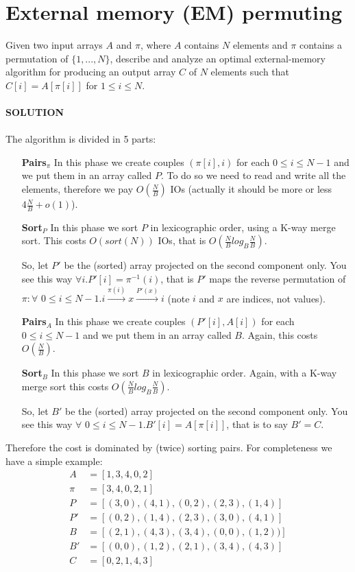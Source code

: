 \documentclass[a4paper]{article}
\begin{document}
\section*{External memory (EM) permuting}
Given two input arrays $A$ and $\pi$, where $A$ contains
$N$ elements and $\pi$ contains a permutation of $\{1, . . . , N\}$, describe and analyze an
optimal external-memory algorithm for producing an output array $C$ of $N$ elements
such that $C[i] = A[\pi[i]]$ for $1 \leq i \leq N$.
\\
\\
\textbf{SOLUTION}
\\
\\
The algorithm is divided in 5 parts:
\begin{itemize}
\item[\textbf{Pairs$_\pi$}] In this phase we create couples $(\pi[i],i)$ for each $0 \leq i \leq N-1$ and we put them in an array called $P$. To do so we need to read and write all the elements, therefore we pay $O(\frac{N}{B})$ IOs (actually it should be more or less $4\frac{N}{B}+ o(1)$).
\item[\textbf{Sort$_P$}] In this phase we sort $P$ in lexicographic order, using a K-way merge sort. This costs $O(sort(N))$ IOs, that is $O(\frac{N}{B} log_B \frac{N}{B})$.

So, let $P'$ be the (sorted) array projected on the second component only. You see this way $\forall i.P'[i] = \pi^{-1}(i)$, that is $P'$ maps the reverse permutation of $\pi: \forall$ $0 \leq i \leq N-1.i \stackrel{\pi(i)}{\longrightarrow} x \stackrel{P'(x)}{\longrightarrow} i$ (note $i$ and $x$ are indices, not values).
\item[\textbf{Pairs$_A$}] In this phase we create couples $(P'[i], A[i])$ for each $0 \leq i \leq N-1$ and we put them in an array called $B$. Again, this costs $O(\frac{N}{B})$.
\item[\textbf{Sort$_B$}] In this phase we sort $B$ in lexicographic order. Again, with a K-way merge sort this costs $O(\frac{N}{B} log_B \frac{N}{B})$.

So, let $B'$ be the (sorted) array projected on the second component only. You see this way $\forall$ $0 \leq i \leq N-1.B'[i] = A[\pi[i]]$, that is to say $B' = C$.
\end{itemize}

Therefore the cost is dominated by (twice) sorting pairs. For completeness we have a simple example:
\begin{align*}
A   &= [1,3,4,0,2]\\
\pi &= [3,4,0,2,1]\\
P &= [(3,0),(4,1),(0,2),(2,3),(1,4)]\\
P' &= [(0,2),(1,4),(2,3),(3,0),(4,1)]\\
B &= [(2,1),(4,3),(3,4),(0,0),(1,2))]\\
B' &= [(0,0),(1,2),(2,1),(3,4),(4,3)]\\
C &= [0,2,1,4,3]
\end{align*}
\end{document}
